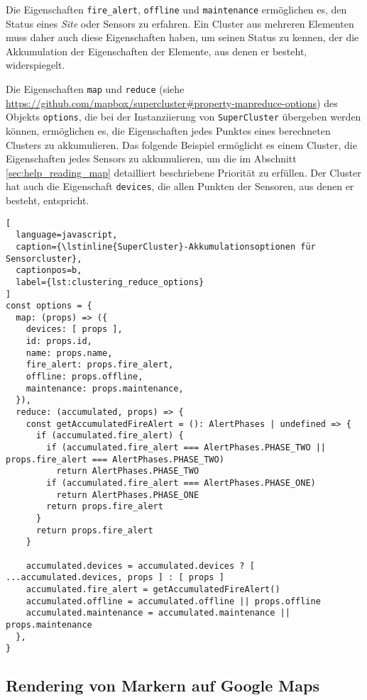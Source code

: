 Die Eigenschaften \lstinline{fire_alert}, \lstinline{offline} und \lstinline{maintenance} ermöglichen es, den Status eines \textit{Site} oder Sensors zu erfahren.
Ein Cluster aus mehreren Elementen muss daher auch diese Eigenschaften haben, um seinen Status zu kennen, der die Akkumulation der Eigenschaften der Elemente, aus denen er besteht, widerspiegelt.

Die Eigenschaften \lstinline{map} und \lstinline{reduce} (siehe \href{https://github.com/mapbox/supercluster\#property-mapreduce-options}{https://github.com/mapbox/supercluster\#property-mapreduce-options}) des Objekts \lstinline{options}, die bei der Instanziierung von \lstinline{SuperCluster} übergeben werden können, ermöglichen es, die Eigenschaften jedes Punktes eines berechneten Clusters zu akkumulieren.
Das folgende Beispiel ermöglicht es einem Cluster, die Eigenschaften jedes Sensors zu akkumulieren, um die im Abschnitt \ref{sec:help_reading_map} detailliert beschriebene Priorität zu erfüllen.
Der Cluster hat auch die Eigenschaft \lstinline{devices}, die allen Punkten der Sensoren, aus denen er besteht, entspricht.

\begin{lstlisting}[
  language=javascript,
  caption={\lstinline{SuperCluster}-Akkumulationsoptionen für Sensorcluster},
  captionpos=b,
  label={lst:clustering_reduce_options}
]
const options = {
  map: (props) => ({
    devices: [ props ],
    id: props.id,
    name: props.name,
    fire_alert: props.fire_alert,
    offline: props.offline,
    maintenance: props.maintenance,
  }),
  reduce: (accumulated, props) => {
    const getAccumulatedFireAlert = (): AlertPhases | undefined => {
      if (accumulated.fire_alert) {
        if (accumulated.fire_alert === AlertPhases.PHASE_TWO || props.fire_alert === AlertPhases.PHASE_TWO)
          return AlertPhases.PHASE_TWO
        if (accumulated.fire_alert === AlertPhases.PHASE_ONE)
          return AlertPhases.PHASE_ONE
        return props.fire_alert
      }
      return props.fire_alert
    }

    accumulated.devices = accumulated.devices ? [ ...accumulated.devices, props ] : [ props ]
    accumulated.fire_alert = getAccumulatedFireAlert()
    accumulated.offline = accumulated.offline || props.offline
    accumulated.maintenance = accumulated.maintenance || props.maintenance
  },
}
\end{lstlisting}


\subsection{Rendering von Markern auf Google Maps}

